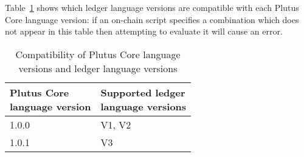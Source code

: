 \noindent Table~\ref{table:version-dependencies} shows which ledger language
versions are compatible with each Plutus Core language version: if an on-chain
script specifies a combination which does not appear in this table then
attempting to evaluate it will cause an error.
 
\begin{table}[H]
  \centering
    \begin{tabular}{|l|l|}
        \hline
        \thead{Plutus Core \\ language version} & \thead{Supported ledger \\ language versions}\\
        \hline
        1.0.0 & V1, V2\\
        1.0.1 & V3 \\
        \hline
    \end{tabular}
    \caption{Compatibility of Plutus Core language versions and ledger language versions}
    \label{table:version-dependencies}
\end{table}

